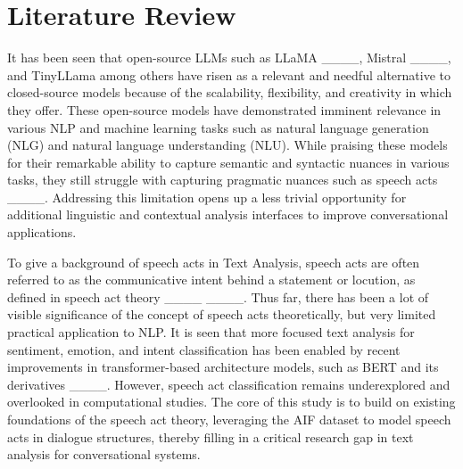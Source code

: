 \section{Literature Review}
It has been seen that open-source LLMs such as LLaMA ____, Mistral ____, and TinyLLama among others have risen as a relevant and needful alternative to closed-source models because of the scalability, flexibility, and creativity in which they offer. These open-source models have demonstrated imminent relevance in various NLP and machine learning tasks such as natural language generation (NLG) and natural language understanding (NLU). While praising these models for their remarkable ability to capture semantic and syntactic nuances in various tasks, they still struggle with capturing pragmatic nuances such as speech acts ____. Addressing this limitation opens up a less trivial opportunity for additional linguistic and contextual analysis interfaces to improve conversational applications. 

To give a background of speech acts in Text Analysis, speech acts are often referred to as the communicative intent behind a statement or locution, as defined in speech act theory ____ ____. Thus far, there has been a lot of visible significance of the concept of speech acts theoretically, but very limited practical application to NLP. It is seen that more focused text analysis for sentiment, emotion, and intent classification has been enabled by recent improvements in transformer-based architecture models, such as BERT and its derivatives ____. However, speech act classification remains underexplored and overlooked in computational studies. The core of this study is to build on existing foundations of the speech act theory, leveraging the AIF dataset to model speech acts in dialogue structures, thereby filling in a critical research gap in text analysis for conversational systems.
